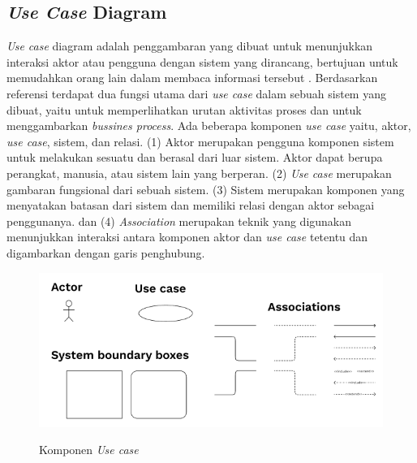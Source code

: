 \begin{flushleft}
\begin{justify}
           
         

        \subsection{\textit{Use Case} Diagram}
            \textit{Use case} diagram adalah penggambaran yang dibuat untuk menunjukkan interaksi aktor atau pengguna dengan sistem yang dirancang, bertujuan untuk memudahkan orang lain dalam membaca informasi tersebut \cite{use case 1,use case 2}.
            Berdasarkan referensi \cite{use case 1} terdapat dua fungsi utama dari \textit{use case} dalam sebuah sistem yang dibuat, yaitu untuk memperlihatkan urutan aktivitas proses dan untuk menggambarkan \textit{bussines process}. 
            Ada beberapa komponen \emph{use case} \cite{use case 1, figma uc} yaitu, aktor, \emph{use case}, sistem, dan relasi.
            (1) Aktor merupakan pengguna komponen sistem untuk melakukan sesuatu dan berasal dari luar sistem. Aktor dapat berupa perangkat, manusia, atau sistem lain yang berperan. (2) \emph{Use case} merupakan gambaran fungsional dari sebuah sistem. 
            (3) Sistem merupakan komponen yang menyatakan batasan dari sistem dan memiliki relasi dengan aktor sebagai penggunanya. dan (4) \emph{Association} merupakan teknik yang digunakan menunjukkan interaksi antara komponen aktor dan \emph{use case} tetentu dan digambarkan dengan garis penghubung.
            \begin{figure}[ht]
                \centering
                \includegraphics[width=12cm]{images/bab 2/use componen.png}\\
                \caption{Komponen \textit{Use case}}
            \end{figure}


\end{justify}
\end{flushleft}
